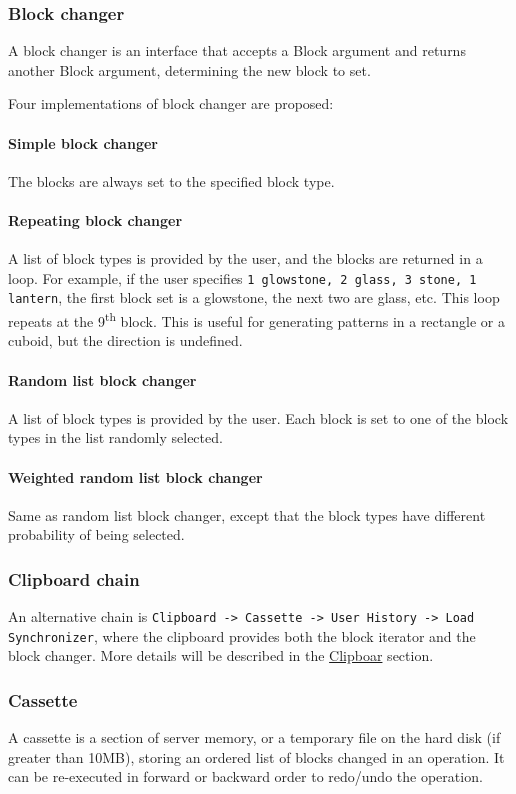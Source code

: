 \documentclass{article}
\def \sup #1{\textsuperscript{#1}}
\begin{document}
			\subsubsection{Block changer}
				A block changer is an interface that accepts a Block argument and returns another Block argument,
				determining the new block to set.

				Four implementations of block changer are proposed:
				\paragraph{Simple block changer} The blocks are always set to the specified block type.
				\paragraph{Repeating block changer} A list of block types is provided by the user, and the blocks are
				returned in a loop. For example, if the user specifies \texttt{1 glowstone, 2 glass, 3 stone, 1 lantern},
				the first block set is a glowstone, the next two are glass, etc. This loop repeats at the 9\sup{th}
				block. This is useful for generating patterns in a rectangle or a cuboid, but the direction is undefined.
				\paragraph{Random list block changer} A list of block types is provided by the user. Each block is set
				to one of the block types in the list randomly selected.
				\paragraph{Weighted random list block changer} Same as random list block changer, except that the block
				types have different probability of being selected.

			\subsubsection{Clipboard chain}
				An alternative chain is \texttt{Clipboard -> Cassette -> User History -> Load Synchronizer}, where the
				clipboard provides both the block iterator and the block changer. More details will be described in the
				\hyperref[sec:clipboard]{Clipboar} section.

			\subsubsection{Cassette}
				A cassette is a section of server memory, or a temporary file on the hard disk (if greater than 10MB),
				storing an ordered list of blocks changed in an operation. It can be re-executed in forward or backward
				order to redo/undo the operation.
\end{document}
